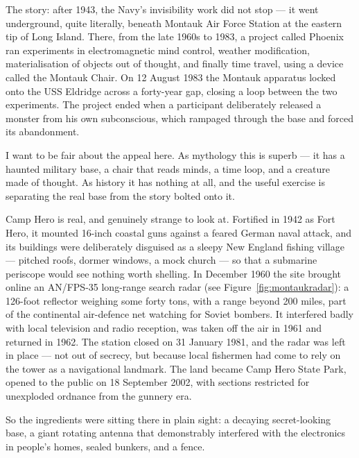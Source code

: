 The story: after 1943, the Navy's invisibility work did not stop --- it went underground, quite
literally, beneath Montauk Air Force Station at the eastern tip of Long Island. There, from the
late 1960s to 1983, a project called Phoenix ran experiments in electromagnetic mind control,
weather modification, materialisation of objects out of thought, and finally time travel, using
a device called the Montauk Chair. On 12 August 1983 the Montauk apparatus locked onto the USS
Eldridge across a forty-year gap, closing a loop between the two experiments. The project
ended when a participant deliberately released a monster from his own subconscious, which
rampaged through the base and forced its abandonment.

I want to be fair about the appeal here. As mythology this is superb --- it has a haunted
military base, a chair that reads minds, a time loop, and a creature made of thought. As
history it has nothing at all, and the useful exercise is separating the real base from the
story bolted onto it.

Camp Hero is real, and genuinely strange to look at. Fortified in 1942 as Fort Hero, it mounted
16-inch coastal guns against a feared German naval attack, and its buildings were deliberately
disguised as a sleepy New England fishing village --- pitched roofs, dormer windows, a mock
church --- so that a submarine periscope would see nothing worth shelling. In December 1960 the
site brought online an AN/FPS-35 long-range search radar (see Figure~\ref{fig:montaukradar}): a
126-foot reflector weighing some forty tons, with a range beyond 200 miles, part of the
continental air-defence net watching for Soviet bombers. It interfered badly with local
television and radio reception, was taken off the air in 1961 and returned in 1962. The station
closed on 31 January 1981, and the radar was left in place --- not out of secrecy, but because
local fishermen had come to rely on the tower as a navigational landmark. The land became Camp
Hero State Park, opened to the public on 18 September 2002, with sections restricted for
unexploded ordnance from the gunnery era.

So the ingredients were sitting there in plain sight: a decaying secret-looking base, a giant
rotating antenna that demonstrably interfered with the electronics in people's homes, sealed
bunkers, and a fence.

